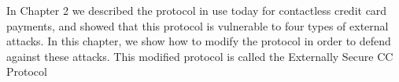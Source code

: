 In Chapter 2 we described the protocol in use today for contactless credit card payments,
    and showed that this protocol is vulnerable to four types of external attacks.
In this chapter, we show how to modify the protocol in order to defend against these attacks.
This modified protocol is called the Externally Secure CC Protocol
